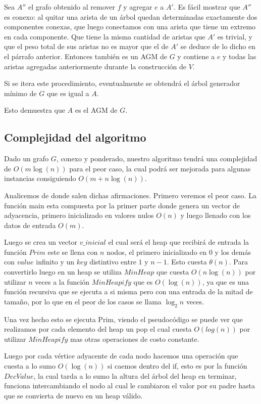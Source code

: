 Sea $A''$ el grafo obtenido al remover $f$ y agregar $e$ a $A'$. Es fácil mostrar que $A''$ es conexo: al quitar una arista de un árbol quedan determinadas exactamente dos componentes conexas, que luego conectamos con una arista que tiene un extremo en cada componente. Que tiene la misma cantidad de aristas que $A'$ es trivial, y que el peso total de sus aristas no es mayor que el de $A'$ se deduce de lo dicho en el párrafo anterior. Entonces también es un AGM de $G$ y contiene a $e$ y todas las aristas agregadas anteriormente durante la construcción de $V$. 

Si se itera este procedimiento, eventualmente se obtendrá el árbol generador mínimo de $G$ que es igual a $A$.

Esto demuestra que $A$ es el AGM de $G$.

\subsection{Complejidad del algoritmo}

Dado un grafo $G$, conexo y ponderado, nuestro algoritmo tendrá una complejidad de $O(m \log(n))$ para el peor caso, la cual podrá ser mejorada para algunas instancias consiguiendo $O(m + n \log(n))$.

Analicemos de donde salen dichas afirmaciones. Primero veremos el peor caso. La función main esta compuesta por la primer parte donde  genera un vector de adyacencia, primero inicializado en valores nulos $O(n)$ y luego llenado con los datos de entrada $O(m)$.

Luego se crea un vector $v\_inicial$ el cual será el heap que recibirá de entrada la función $Prim$ este se llena con $n$ nodos, el primero inicializado en $0$ y los demás con $value$ infinito y un $key$ distintivo entre $1$ y $n-1$. 
Esto cuesta $\theta(n)$. Para convertirlo luego en un heap se utiliza $MinHeap$ que cuesta $O(n \log(n))$ por utilizar $n$ veces a la función $MinHeapify$ que es $O(\log(n))$, ya que es una función recursiva que se ejecuta a si misma pero con una entrada de la mitad de tamaño, por lo que en el peor de los casos se llama $\log_2 n$ veces.

Una vez hecho esto se ejecuta Prim, viendo el pseudocódigo se puede ver que realizamos por cada elemento del heap un pop el cual cuesta $O(log(n))$ por utilizar $MinHeapify$ mas otras operaciones de costo constante.

Luego por cada vértice adyacente de cada nodo hacemos una operación que cuesta a lo sumo $O(\log(n))$ si caemos dentro del if, esto es por la función $DecValue$, la cual tarda a lo sumo la altura del árbol del heap en terminar, funciona intercambiando el nodo al cual le cambiaron el valor por su padre hasta que se convierta de nuevo en un heap válido.

